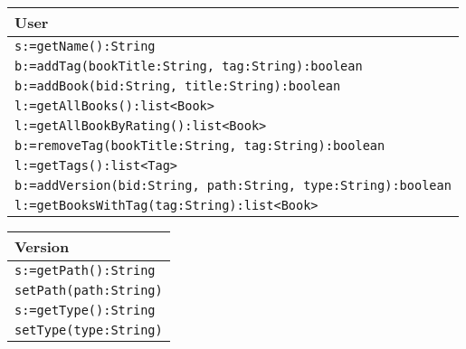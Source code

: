 \documentclass[12pt]{article}
\begin{document}
\begin{tabular}{| l |}
    \hline
    User\\
    \hline
    \texttt{s:=getName():String}\\
    \texttt{b:=addTag(bookTitle:String, tag:String):boolean}\\
    \texttt{b:=addBook(bid:String, title:String):boolean}\\
    \texttt{l:=getAllBooks():list<Book>}\\
    \texttt{l:=getAllBookByRating():list<Book>}\\
    \texttt{b:=removeTag(bookTitle:String, tag:String):boolean}\\
    \texttt{l:=getTags():list<Tag>}\\
    \texttt{b:=addVersion(bid:String, path:String, type:String):boolean}\\
    \texttt{l:=getBooksWithTag(tag:String):list<Book>}\\
    \hline
    
\end{tabular}
\vspace{1cm}

\begin{tabular}{| l |}
    \hline
    Version\\
    \hline
    \texttt{s:=getPath():String}\\
    \texttt{setPath(path:String)}\\
    \texttt{s:=getType():String}\\
    \texttt{setType(type:String)}\\
    \hline
    
\end{tabular}
\vspace{1cm}
\end{document}

